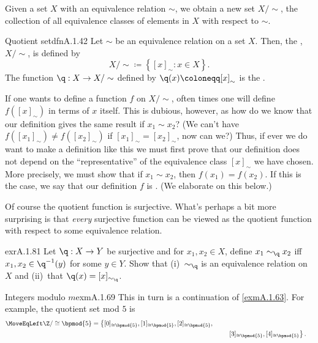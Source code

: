 Given a set $X$ with an equivalence relation $\sim$, we obtain a new set $X/\sim$, the collection of all equivalence classes of elements in $X$ with respect to $\sim$.
\begin{dfn}{Quotient set}{dfnA.1.42}
Let $\sim$ be an equivalence relation on a set $X$.  Then, the , $X/\sim$, is defined by
\begin{equation}
X/\sim \coloneqq \left\{ [x]_\sim :x\in X\right\} .
\end{equation}
The function $\q :X\rightarrow X/\sim$ defined by $\q (x)\coloneqq [x]_\sim$ is the .
\begin{rmk}
	If one wants to define a function $f$ on $X/\sim$, often times one will define $f([x]_{\sim})$ in terms of $x$ itself.  This is dubious, however, as how do we know that our definition gives the same result if $x_1\sim x_2$?  (We can't have $f([x_1]_{\sim})\neq f([x_2]_{\sim})$ if $[x_1]_{\sim}=[x_2]_{\sim}$, now can we?)  Thus, if ever we do want to make a definition like this we must first prove that our definition does not depend on the ``representative'' of the equivalence class $[x]_{\sim}$ we have chosen.  More precisely, we must show that if $x_1\sim x_2$, then $f(x_1)=f(x_2)$.  If this is the case, we say that our definition $f$ is .  (We elaborate on this below.)
\end{rmk}
\end{dfn}
Of course the quotient function is surjective.  What's perhaps a bit more surprising is that \emph{every} surjective function can be viewed as the quotient function with respect to some equivalence relation.
\begin{exr}{}{exrA.1.81}
Let $\q :X\rightarrow Y$ be surjective and for $x_1,x_2\in X$, define $x_1\sim _{\q}x_2$\index[notation]{$\sim _{\q}$} iff $x_1,x_2\in \q ^{-1}(y)$ for some $y\in Y$.  Show that (i)~$\sim _{\q}$ is an equivalence relation on $X$ and (ii)~that $\q (x)=[x]_{\sim _{\q}}$.
\end{exr}
\begin{exm}{Integers modulo $m$}{exmA.1.69}
This in turn is a continuation of \cref{exmA.1.63}.  For example, the quotient set mod $5$ is
\begin{equation*}
\begin{split}
\MoveEqLeft
\Z /\cong \bpmod{5}=\left\{ [0]_{\cong \bpmod{5}},[1]_{\cong \bpmod{5}},[2]_{\cong \bpmod{5}},\right. \\ & \qquad \left. [3]_{\cong \bpmod{5}},[4]_{\cong \bpmod{5}}\right\} .
\end{split}
\end{equation*}
\end{exm}

